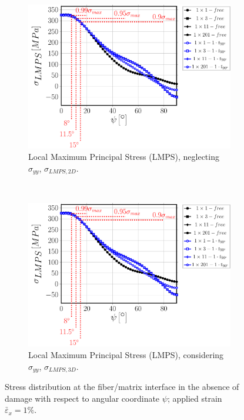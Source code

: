 \begin{figure}[!hp]
    \begin{subfigure}[b]{0.4\textwidth}
        \includegraphics[width=\textwidth]{paperE/vf60-nodamage-sigmaI2D.pdf}
        \caption{Local Maximum Principal Stress (LMPS), neglecting $\sigma_{yy}$, $\sigma_{LMPS,2D}$.}\label{chap3:paperE:fig:stress-g}
    \end{subfigure} ~
    \begin{subfigure}[b]{0.4\textwidth}
        \includegraphics[width=\textwidth]{paperE/vf60-nodamage-sigmaI3D.pdf}
        \caption{Local Maximum Principal Stress (LMPS), considering $\sigma_{yy}$, $\sigma_{LMPS,3D}$.}\label{chap3:paperE:fig:stress-h}
    \end{subfigure}

\caption{Stress distribution at the fiber/matrix interface in the absence of damage with respect to angular coordinate $\psi$; applied strain $\bar{\varepsilon}_{x}=1\%$.}\label{chap3:paperE:fig:stress}
\end{figure}

